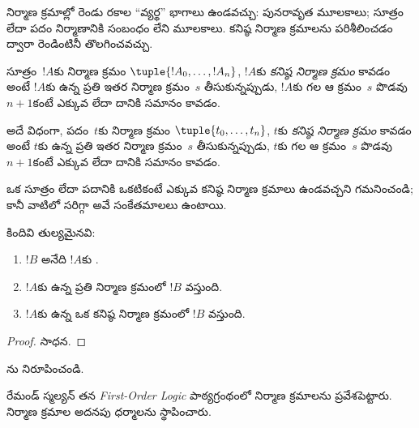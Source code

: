 \documentclass[../../../include/open-logic-section]{subfiles}
\begin{document}
నిర్మాణ క్రమాల్లో రెండు రకాల ``వ్యర్థ'' భాగాలు ఉండవచ్చు: పునరావృత
మూలకాలు; సూత్రం లేదా పదం నిర్మాణానికి సంబంధం లేని మూలకాలు. కనిష్ఠ
నిర్మాణ క్రమాలను పరిశీలించడం ద్వారా రెండింటినీ తొలగించవచ్చు.

\begin{defn}[కనిష్ఠ నిర్మాణ క్రమాలు]
సూత్రం~$!A$కు నిర్మాణ క్రమం $\tuple{!A_0, \ldots, !A_n}$,
$!A$కు \emph{కనిష్ఠ నిర్మాణ క్రమం} కావడం అంటే $!A$కు ఉన్న ప్రతి ఇతర
నిర్మాణ క్రమం~$s$ తీసుకున్నప్పుడు, $!A$కు గల ఆ క్రమం~$s$ పొడవు $n+1$కంటే ఎక్కువ
లేదా దానికి సమానం కావడం.

అదే విధంగా, పదం~$t$కు నిర్మాణ క్రమం $\tuple{t_0, \ldots, t_n}$,
$t$కు \emph{కనిష్ఠ నిర్మాణ క్రమం} కావడం అంటే $t$కు ఉన్న ప్రతి ఇతర
నిర్మాణ క్రమం~$s$ తీసుకున్నప్పుడు, $t$కు గల ఆ క్రమం~$s$ పొడవు $n+1$కంటే ఎక్కువ లేదా
దానికి సమానం కావడం.
\end{defn}

ఒక సూత్రం లేదా పదానికి ఒకటికంటే ఎక్కువ కనిష్ఠ నిర్మాణ క్రమాలు
ఉండవచ్చని గమనించండి; కానీ వాటిలో సరిగ్గా అవే సంకేతమాలలు ఉంటాయి.

\begin{prop}
కిందివి తుల్యమైనవి:
\begin{enumerate}
    \item $!B$ అనేది $!A$కు .
    \item $!A$కు ఉన్న ప్రతి నిర్మాణ క్రమంలో $!B$ వస్తుంది.
    \item $!A$కు ఉన్న ఒక కనిష్ఠ నిర్మాణ క్రమంలో $!B$ వస్తుంది.
\end{enumerate}
\end{prop}

\begin{proof}
సాధన.
\end{proof}

\begin{prob}
ను నిరూపించండి.
\end{prob}

\begin{history}
రేమండ్ స్మల్యన్ తన \emph{First-Order Logic} పాఠ్యగ్రంథంలో
\citep{Smullyan1968} నిర్మాణ క్రమాలను ప్రవేశపెట్టారు. నిర్మాణ క్రమాల
అదనపు ధర్మాలను \citet{Zuckerman1973} స్థాపించారు.
\end{history}
\end{document}
